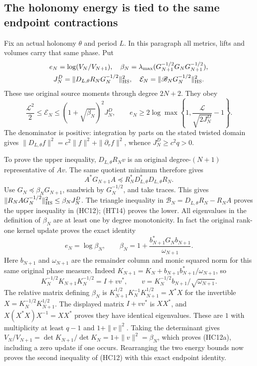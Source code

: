 \subsection{The holonomy energy is tied to the same endpoint contractions}

Fix an actual holonomy $\theta$ and period $L$.  In this paragraph all
metrics, lifts and volumes carry that same phase.  Put
\[
 \begin{gathered}
 e_N=\log(V_N/V_{N+1}),\quad
 \beta_N=\lambda_{\max}
 (G_{N+1}^{-1/2}G_NG_{N+1}^{-1/2}),\\
 J_N^{D}=\|D_{L,\theta}R_NG_N^{-1/2}\|_{\rm HS}^{2},\quad
 \mathcal E_N=\|\mathscr B_NG_N^{-1/2}\|_{\rm HS}^{2}.
 \end{gathered}
\]
These use original source moments through degree $2N+2$.  They obey
\[
 \boxed{
 \frac{\mathcal L^2}{2}\leq\mathcal E_N
 \leq(1+\sqrt{\beta_N})^2J_N^D,
 \qquad
 e_N\geq2\log\max\left\{1,
 \frac{\mathcal L}{\sqrt{2J_N^D}}-1\right\}.}
 \tag{HC12}
\]
The denominator is positive: integration by parts on the stated
twisted domain gives
$\|D_{L,\theta}f\|^2=c^2\|f\|^2+\|\partial_rf\|^2$, whence
$J_N^D\geq c^2q>0$.

To prove the upper inequality, $D_{L,\theta}R_Nv$ is an original
degree-$(N+1)$ representative of $Av$.  The same quotient minimum
therefore gives
\[
 A^*G_{N+1}A\preceq R_N^*D_{L,\theta}^*D_{L,\theta}R_N.
\]
Use $G_N\preceq\beta_NG_{N+1}$, sandwich by $G_N^{-1/2}$, and take
traces.  This gives
$\|R_NAG_N^{-1/2}\|_{\rm HS}^2\leq\beta_NJ_N^D$.
The triangle inequality in $\mathscr B_N=D_{L,\theta}R_N-R_NA$
proves the upper inequality in (HC12); (HT14) proves the lower.
All eigenvalues in the definition of $\beta_N$ are at least one by
degree monotonicity.  In fact the original rank-one kernel update proves
the exact identity
\[
 e_N=\log\beta_N,\qquad
 \beta_N=1+\frac{b_{N+1}^*G_Nb_{N+1}}{\omega_{N+1}}.
 \tag{HC12a}
\]
Here $b_{N+1}$ and $\omega_{N+1}$ are the remainder column and monic
squared norm for this same original phase measure.  Indeed
$K_{N+1}=K_N+b_{N+1}b_{N+1}^*/\omega_{N+1}$, so
\[
 K_N^{-1/2}K_{N+1}K_N^{-1/2}=I+vv^*,\qquad
 v=K_N^{-1/2}b_{N+1}/\sqrt{\omega_{N+1}}.
\]
The relative matrix defining $\beta_N$ is
$K_{N+1}^{1/2}K_N^{-1}K_{N+1}^{1/2}=X^*X$ for the invertible
$X=K_N^{-1/2}K_{N+1}^{1/2}$.  The displayed matrix $I+vv^*$ is
$XX^*$, and $X(X^*X)X^{-1}=XX^*$ proves they have identical eigenvalues.
These are $1$ with multiplicity at least $q-1$ and $1+\|v\|^2$.
Taking the determinant gives
$V_N/V_{N+1}=\det K_{N+1}/\det K_N=1+\|v\|^2=\beta_N$,
which proves (HC12a), including a zero update if one occurs.
Rearranging the two energy bounds now proves the second inequality
of (HC12) with this exact endpoint identity.

